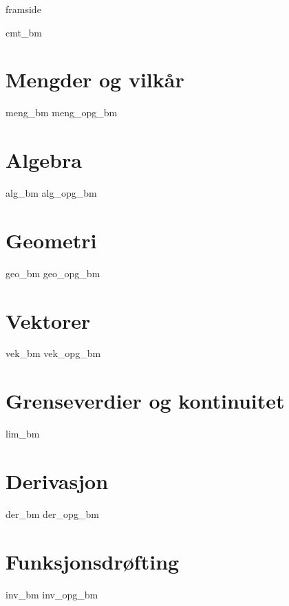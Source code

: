 




\addto\captionsenglish{\renewcommand{\figurename}{Figur}}
\makeatletter
\addto\captionsenglish{\renewcommand{\chaptername}{Kapittel}}
\addto\captionsenglish{\renewcommand{\contentsname}{Innhold}}


	
	{framside}
	
	{\footnotesize \tableofcontents}
	\newpage
	
	{cmt_bm}
	
	\chapter{Mengder og vilkår}
	\newpage
	{meng_bm}
	{meng_opg_bm}
	
	\chapter{Algebra}
	\newpage
	{alg_bm}
	{alg_opg_bm}
	
	\chapter{Geometri}
	\newpage
	{geo_bm}
	{geo_opg_bm}	
	
	\chapter{Vektorer}
	\newpage
	{vek_bm}
	{vek_opg_bm}	
		
	\chapter{Grenseverdier og kontinuitet}
	\newpage
	{lim_bm}	
	
	\chapter{Derivasjon} \label{Derivasjon}
	\newpage
	{der_bm}
	{der_opg_bm}	
	
	\chapter{Funksjonsdrøfting}
	\newpage
	{inv_bm}
	{inv_opg_bm}
	
